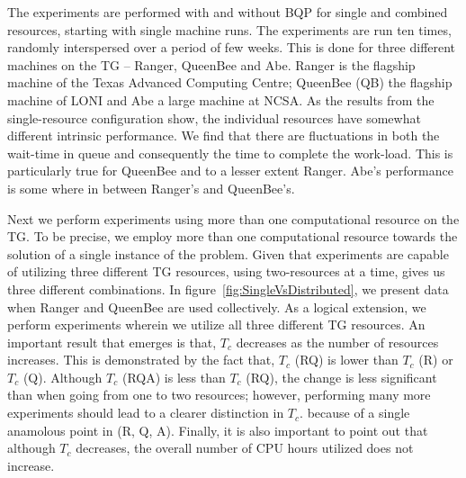 \documentclass{acm_proc_article-sp}
\newcommand{\tc}{$T_c$ }
\newcommand{\tcnsp}{$T_c$}
\newcommand{\up}{\vspace*{-0.3em}}
\begin{document}
The experiments are performed with and without BQP for single and combined resources, starting
with single machine runs. The experiments are run ten
times, randomly interspersed over a period of few weeks. This is done for three different machines on the TG -- 
Ranger, QueenBee and Abe.  Ranger is the flagship machine of 
the Texas Advanced Computing Centre; QueenBee (QB) the flagship machine of LONI and Abe a large machine at NCSA.
As the results from the single-resource configuration show, the individual resources have somewhat different 
intrinsic performance. We find that there are fluctuations in both the wait-time in queue and 
consequently the time to complete the work-load. This is particularly true for QueenBee and to a lesser extent 
Ranger. Abe's performance is some where in between Ranger's and QueenBee's.

Next we perform experiments using more than one computational resource on the TG. To be precise, we employ more 
than one computational resource towards the solution of a single instance of the problem.  Given that experiments 
are capable of utilizing three different TG resources, using two-resources at a time, gives us three different 
combinations. In figure~\ref{fig:SingleVsDistributed}, we present data when Ranger and QueenBee are used 
collectively.  As a logical extension, we perform experiments wherein we utilize all three different TG 
resources. An important result that emerges is
that, \tc decreases as the number of resources increases. This is demonstrated by the fact that, \tc (RQ) is lower 
than \tc (R) or \tc (Q).  Although \tc (RQA) is less than \tc (RQ), the change is less significant than when going 
from one to two resources; however, performing many more experiments should lead to a clearer distinction in 
\tcnsp. because of a single anamolous point in (R, Q, A).
Finally, it is also important to point out that although \tc decreases, the overall number of CPU hours utilized 
does not increase.

\begin{table}
\begin{center}

\caption{Table showing the configurations chosen
  on Ranger, with and without BQP. Notice how the use
  of BQP has a small, but significant change in the queue, size and duration
  requested.}\up\up\up\up\up\up\up
\label{table:RangerBQP}
\end{center}
\end{table}
\end{document}
